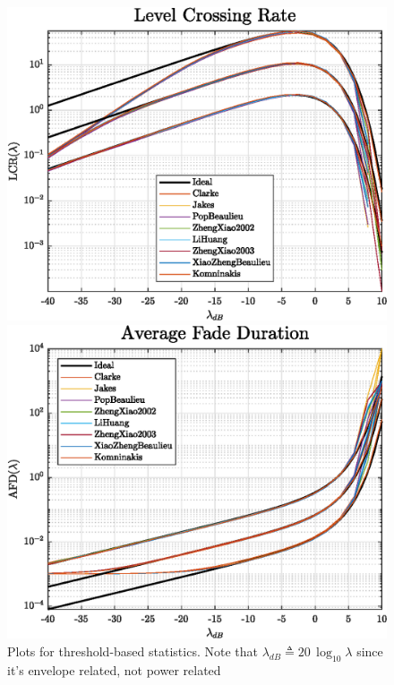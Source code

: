 \begin{figure}
	\hfill
	\begin{minipage}{.45\linewidth}
		\includegraphics[width=\linewidth]{img/multiLCR.eps}
	\end{minipage}
	\hfill
	\begin{minipage}{.45\linewidth}
		\includegraphics[width=\linewidth]{img/multiAFD.eps}
	\end{minipage}
	\hfill
	
	\caption{Plots for threshold-based statistics. Note that $\lambda_{dB} \triangleq 20\, \log_{10} \lambda$ since it's envelope related, not power related}
	\label{fig:LCR_AFD}
\end{figure}

